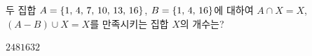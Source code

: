 두 집합 $A=\{1,\mkern3mu 4,\mkern3mu 7,\mkern3mu 10,\mkern3mu 13,\mkern3mu 16\}$, $B=\{1,\mkern3mu 4,\mkern3mu 16\}$에 대하여 $A\cap X=X$, $(A-B)\cup X=X$를 만족시키는 집합 $X$의 개수는?
\begin{choices32}{$2$}{$4$}{$8$}{$16$}{$32$}\end{choices32}
